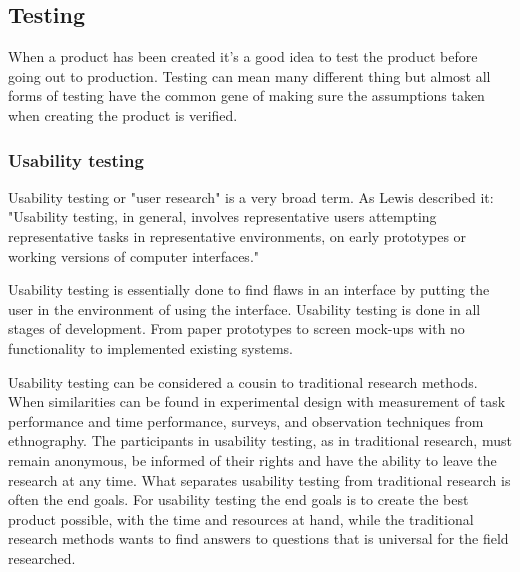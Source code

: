 




\subsection{Testing}%
\label{sub:Testing}
When a product has been created it's a good idea to test the product before going out to production. Testing can mean many different thing but almost all forms of testing have the common gene of making sure the assumptions taken when creating the product is verified. 

\subsubsection{Usability testing}%
\label{ssub:User testing}
Usability testing or "user research" is a very broad term. As Lewis \cite{lewis2006usability} described it: "Usability testing, in general, involves representative users attempting representative tasks in representative environments, on early prototypes or working versions of computer interfaces."

Usability testing is essentially done to find flaws in an interface by putting the user in the environment of using the interface. Usability testing is done in all stages of development. From paper prototypes to screen mock-ups with no functionality to implemented existing systems. 

Usability testing can be considered a cousin to traditional research methods. When similarities can be found in experimental design with measurement of task performance and time performance, surveys, and observation techniques from ethnography. The participants in usability testing, as in traditional research, must remain anonymous, be informed of their rights and have the ability to leave the research at any time. 
What separates usability testing from traditional research is often the end goals. For usability testing the end goals is to create the best product possible, with the time and resources at hand, while the traditional research methods wants to find answers to questions that is universal for the field researched. 


